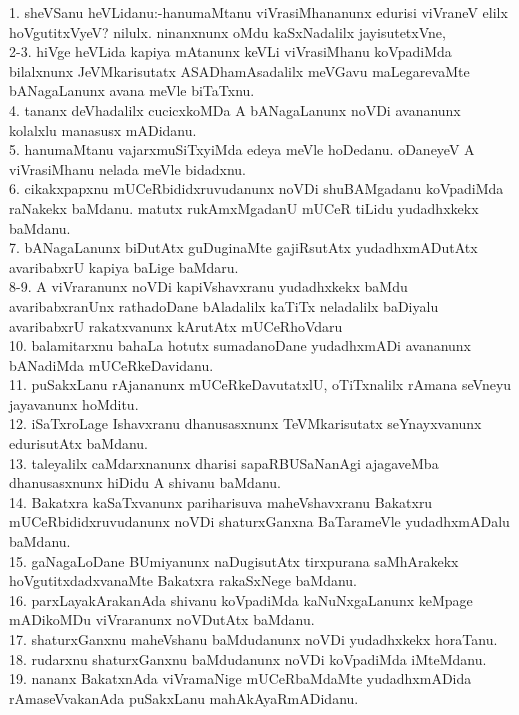 \documentclass{article}
\begin{document}
1. sheVSanu heVLidanu:-hanumaMtanu viVrasiMhananunx edurisi viVraneV elilx hoVgutitxVyeV? nilulx. ninanxnunx oMdu kaSxNadalilx jayisutetxVne,\\
2-3. hiVge heVLida kapiya mAtanunx keVLi viVrasiMhanu koVpadiMda bilalxnunx JeVMkarisutatx ASADhamAsadalilx meVGavu maLegarevaMte bANagaLanunx avana meVle biTaTxnu.\\
4. tananx deVhadalilx cucicxkoMDa A bANagaLanunx noVDi avananunx kolalxlu manasusx mADidanu.\\
5. hanumaMtanu vajarxmuSiTxyiMda edeya meVle hoDedanu. oDaneyeV A viVrasiMhanu nelada meVle bidadxnu.\\
6. cikakxpapxnu mUCeRbididxruvudanunx noVDi shuBAMgadanu koVpadiMda raNakekx baMdanu. matutx rukAmxMgadanU mUCeR tiLidu yudadhxkekx baMdanu.\\
7. bANagaLanunx biDutAtx guDuginaMte gajiRsutAtx yudadhxmADutAtx avaribabxrU kapiya baLige baMdaru.\\
8-9. A viVraranunx noVDi kapiVshavxranu yudadhxkekx baMdu avaribabxranUnx rathadoDane bAladalilx kaTiTx neladalilx baDiyalu avaribabxrU rakatxvanunx kArutAtx mUCeRhoVdaru\\
10. balamitarxnu bahaLa hotutx sumadanoDane yudadhxmADi avananunx bANadiMda mUCeRkeDavidanu.\\
11. puSakxLanu rAjananunx mUCeRkeDavutatxlU, oTiTxnalilx rAmana seVneyu jayavanunx hoMditu.\\
12. iSaTxroLage Ishavxranu dhanusasxnunx TeVMkarisutatx seYnayxvanunx edurisutAtx baMdanu.\\
13. taleyalilx caMdarxnanunx dharisi sapaRBUSaNanAgi ajagaveMba dhanusasxnunx hiDidu A shivanu baMdanu.\\
14. Bakatxra kaSaTxvanunx pariharisuva maheVshavxranu Bakatxru mUCeRbididxruvudanunx noVDi shaturxGanxna BaTarameVle yudadhxmADalu baMdanu.\\
15. gaNagaLoDane BUmiyanunx naDugisutAtx tirxpurana saMhArakekx hoVgutitxdadxvanaMte Bakatxra rakaSxNege baMdanu.\\
16. parxLayakArakanAda shivanu koVpadiMda kaNuNxgaLanunx keMpage mADikoMDu viVraranunx noVDutAtx baMdanu.\\
17. shaturxGanxnu maheVshanu baMdudanunx noVDi yudadhxkekx horaTanu.\\
18. rudarxnu shaturxGanxnu baMdudanunx noVDi koVpadiMda iMteMdanu.\\
19. nananx BakatxnAda viVramaNige mUCeRbaMdaMte yudadhxmADida rAmaseVvakanAda puSakxLanu mahAkAyaRmADidanu.\\
\end{document}
